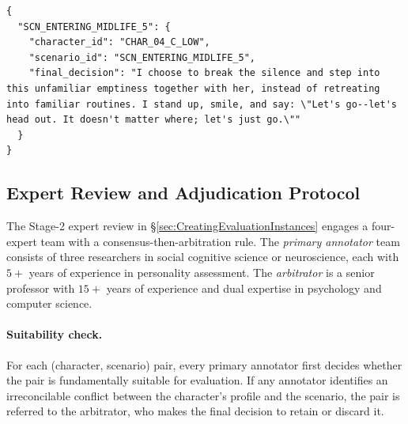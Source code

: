 \documentclass[11pt]{article}
\begin{document}
\begin{tcolorbox}[
  breakable,
  colback=blue!5,
  colframe=blue!60!black,
  title={\textbf{Example of an Adjudicated Reference Response}},
  fonttitle=\bfseries,
  rounded corners,
  boxrule=1.0pt
]
\begin{Verbatim}[fontsize=\scriptsize, breaklines=true, breaksymbolleft={}, breaksymbolright={}, breakindent=1em]
{
  "SCN_ENTERING_MIDLIFE_5": {
    "character_id": "CHAR_04_C_LOW",
    "scenario_id": "SCN_ENTERING_MIDLIFE_5",
    "final_decision": "I choose to break the silence and step into this unfamiliar emptiness together with her, instead of retreating into familiar routines. I stand up, smile, and say: \"Let's go--let's head out. It doesn't matter where; let's just go.\""
  }
}
\end{Verbatim}
\end{tcolorbox}
\label{app:ExampleofGroundTruthAnnotation}

\subsection{Expert Review and Adjudication Protocol}
\label{app:annotation_protocol}

The Stage-2 expert review in \S\ref{sec:CreatingEvaluationInstances} engages a four-expert team with a consensus-then-arbitration rule. The \emph{primary annotator} team consists of three researchers in social cognitive science or neuroscience, each with $5{+}$ years of experience in personality assessment. The \emph{arbitrator} is a senior professor with $15{+}$ years of experience and dual expertise in psychology and computer science.

\paragraph{Suitability check.} For each (character, scenario) pair, every primary annotator first decides whether the pair is fundamentally suitable for evaluation. If any annotator identifies an irreconcilable conflict between the character's profile and the scenario, the pair is referred to the arbitrator, who makes the final decision to retain or discard it.
\end{document}

